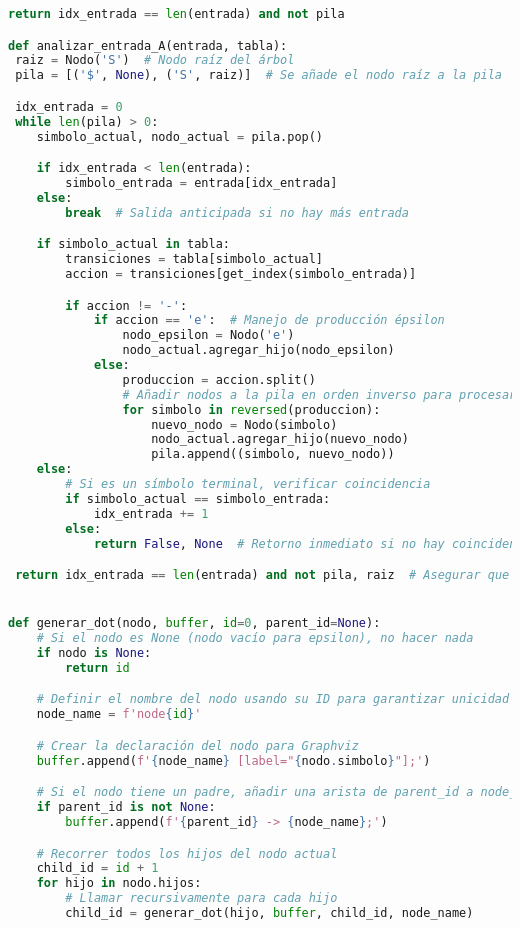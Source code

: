 \documentclass{article}
\begin{document}
\begin{description}
\begin{lstlisting}[language=Python, caption=Funcion: Analisis (main2)]
  return idx_entrada == len(entrada) and not pila

def analizar_entrada_A(entrada, tabla):
 raiz = Nodo('S')  # Nodo raíz del árbol
 pila = [('$', None), ('S', raiz)]  # Se añade el nodo raíz a la pila

 idx_entrada = 0
 while len(pila) > 0:
    simbolo_actual, nodo_actual = pila.pop()

    if idx_entrada < len(entrada):
        simbolo_entrada = entrada[idx_entrada]
    else:
        break  # Salida anticipada si no hay más entrada

    if simbolo_actual in tabla:
        transiciones = tabla[simbolo_actual]
        accion = transiciones[get_index(simbolo_entrada)]

        if accion != '-':
            if accion == 'e':  # Manejo de producción épsilon
                nodo_epsilon = Nodo('e')
                nodo_actual.agregar_hijo(nodo_epsilon)
            else:
                produccion = accion.split()
                # Añadir nodos a la pila en orden inverso para procesar el izquierdo primero
                for simbolo in reversed(produccion):
                    nuevo_nodo = Nodo(simbolo)
                    nodo_actual.agregar_hijo(nuevo_nodo)
                    pila.append((simbolo, nuevo_nodo))
    else:
        # Si es un símbolo terminal, verificar coincidencia
        if simbolo_actual == simbolo_entrada:
            idx_entrada += 1
        else:
            return False, None  # Retorno inmediato si no hay coincidencia

 return idx_entrada == len(entrada) and not pila, raiz  # Asegurar que se consumió toda la entrada y la pila esté vacía


def generar_dot(nodo, buffer, id=0, parent_id=None):
    # Si el nodo es None (nodo vacío para epsilon), no hacer nada
    if nodo is None:
        return id

    # Definir el nombre del nodo usando su ID para garantizar unicidad
    node_name = f'node{id}'

    # Crear la declaración del nodo para Graphviz
    buffer.append(f'{node_name} [label="{nodo.simbolo}"];')

    # Si el nodo tiene un padre, añadir una arista de parent_id a node_name
    if parent_id is not None:
        buffer.append(f'{parent_id} -> {node_name};')

    # Recorrer todos los hijos del nodo actual
    child_id = id + 1
    for hijo in nodo.hijos:
        # Llamar recursivamente para cada hijo
        child_id = generar_dot(hijo, buffer, child_id, node_name)


\end{lstlisting}
\end{description}
\end{document}
